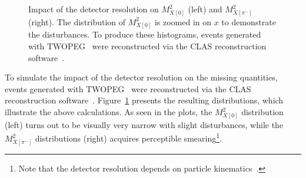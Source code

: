 \begin{figure}[htp]
\begin{center}
\caption{\small Impact of the detector resolution on $M_{X[0]}^{2}$ (left) and $M_{X[\pi^{-}]}^{2}$ (right). The distribution of $M_{X[0]}^{2}$ is zoomed in on $x$ to demonstrate the disturbances. To produce these histograms, events generated with TWOPEG~\cite{twopeg} were reconstructed via the CLAS reconstruction software~\cite{Mecking:2003zu}.} \label{fig:mm_res}
\end{center}
\end{figure}

To simulate the impact of the detector resolution on the missing quantities, events generated with TWOPEG~\cite{twopeg} were reconstructed via the CLAS reconstruction software~\cite{Mecking:2003zu}. Figure~\ref{fig:mm_res} presents the resulting distributions, which illustrate the above calculations. As seen in the plots, the $M_{X[0]}^{2}$ distribution (left) turns out to be visually very narrow with slight disturbances, while the $M_{X[\pi^{-}]}^{2}$ distributions (right) acquires perceptible smearing\footnote[4]{Note that the detector resolution depends on particle kinematics~\cite{Mecking:2003zu}.}. 



